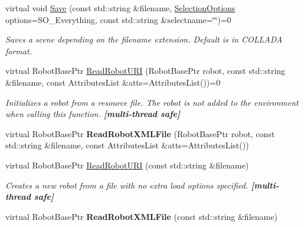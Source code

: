 \begin{DoxyCompactItemize}
\item 
virtual void \hyperlink{classOpenRAVE_1_1EnvironmentBase_a3ad623878891c5dc28f355d1cf348793}{Save} (const std::string \&filename, \hyperlink{classOpenRAVE_1_1EnvironmentBase_a0abab749a8f5d8ff38d62672ae03abee}{SelectionOptions} options=SO\_\-Everything, const std::string \&selectname=\char`\"{}\char`\"{})=0
\begin{DoxyCompactList}\small\item\em Saves a scene depending on the filename extension. Default is in COLLADA format. \item\end{DoxyCompactList}\item 
virtual RobotBasePtr \hyperlink{classOpenRAVE_1_1EnvironmentBase_ac8438f3ee051493a82ef78b92e9309f0}{ReadRobotURI} (RobotBasePtr robot, const std::string \&filename, const AttributesList \&atts=AttributesList())=0
\begin{DoxyCompactList}\small\item\em Initializes a robot from a resource file. The robot is not added to the environment when calling this function. {\bfseries \mbox{[}multi-\/thread safe\mbox{]}} \item\end{DoxyCompactList}\item 
\hypertarget{classOpenRAVE_1_1EnvironmentBase_a93df9cb2035fd4489282e9fbe0f96b93}{
virtual RobotBasePtr {\bfseries ReadRobotXMLFile} (RobotBasePtr robot, const std::string \&filename, const AttributesList \&atts=AttributesList())}
\label{classOpenRAVE_1_1EnvironmentBase_a93df9cb2035fd4489282e9fbe0f96b93}

\item 
\hypertarget{classOpenRAVE_1_1EnvironmentBase_a3f8502be4e272feaacbcb5b7434170be}{
virtual RobotBasePtr \hyperlink{classOpenRAVE_1_1EnvironmentBase_a3f8502be4e272feaacbcb5b7434170be}{ReadRobotURI} (const std::string \&filename)}
\label{classOpenRAVE_1_1EnvironmentBase_a3f8502be4e272feaacbcb5b7434170be}

\begin{DoxyCompactList}\small\item\em Creates a new robot from a file with no extra load options specified. {\bfseries \mbox{[}multi-\/thread safe\mbox{]}} \item\end{DoxyCompactList}\item 
\hypertarget{classOpenRAVE_1_1EnvironmentBase_a43c0a583e42aa537aa889a6a637a4568}{
virtual RobotBasePtr {\bfseries ReadRobotXMLFile} (const std::string \&filename)}
\label{classOpenRAVE_1_1EnvironmentBase_a43c0a583e42aa537aa889a6a637a4568}


\end{DoxyCompactItemize}
